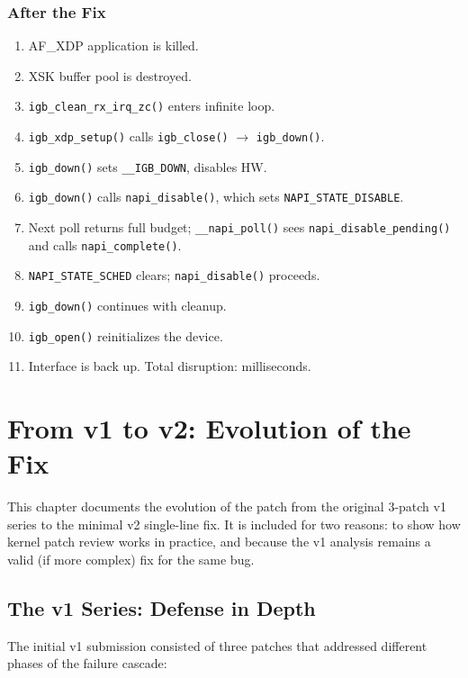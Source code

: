 \documentclass[11pt,a4paper,openany]{book}
\newcommand{\func}[1]{\texttt{#1()}}
\newcommand{\flag}[1]{\texttt{#1}}
\begin{document}
\subsection{After the Fix}

\begin{enumerate}
\item AF\_XDP application is killed.
\item XSK buffer pool is destroyed.
\item \func{igb\_clean\_rx\_irq\_zc} enters infinite loop.
\item \func{igb\_xdp\_setup} calls \func{igb\_close} $\to$
    \func{igb\_down}.
\item \func{igb\_down} sets \flag{\_\_IGB\_DOWN}, disables HW.
\item \func{igb\_down} calls \func{napi\_disable}, which sets
    \flag{NAPI\_STATE\_DISABLE}.
\item Next poll returns full budget; \func{\_\_napi\_poll} sees
    \func{napi\_disable\_pending} and calls \func{napi\_complete}.
\item \flag{NAPI\_STATE\_SCHED} clears; \func{napi\_disable} proceeds.
\item \func{igb\_down} continues with cleanup.
\item \func{igb\_open} reinitializes the device.
\item Interface is back up.  Total disruption: milliseconds.
\end{enumerate}


\chapter{From v1 to v2: Evolution of the Fix}
\label{ch:evolution}

This chapter documents the evolution of the patch from the original
3-patch v1 series to the minimal v2 single-line fix.  It is included
for two reasons: to show how kernel patch review works in practice, and
because the v1 analysis remains a valid (if more complex) fix for the
same bug.

\section{The v1 Series: Defense in Depth}

The initial v1 submission consisted of three patches that addressed
different phases of the failure cascade:
\end{document}
